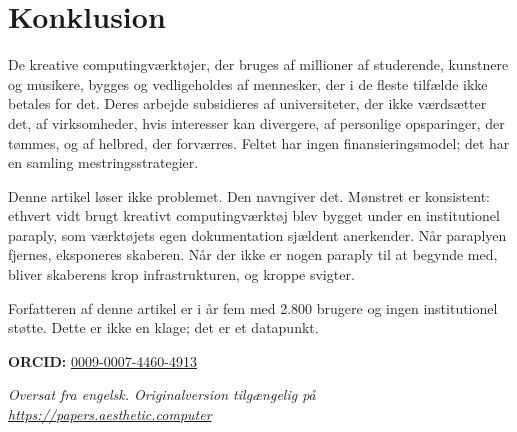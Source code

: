 \documentclass[10pt,letterpaper,twocolumn]{article}
\begin{document}
\section{Konklusion}

De kreative computingværktøjer, der bruges af millioner af studerende, kunstnere og musikere, bygges og vedligeholdes af mennesker, der i de fleste tilfælde ikke betales for det. Deres arbejde subsidieres af universiteter, der ikke værdsætter det, af virksomheder, hvis interesser kan divergere, af personlige opsparinger, der tømmes, og af helbred, der forværres. Feltet har ingen finansieringsmodel; det har en samling mestringsstrategier.

Denne artikel løser ikke problemet. Den navngiver det. Mønstret er konsistent: ethvert vidt brugt kreativt computingværktøj blev bygget under en institutionel paraply, som værktøjets egen dokumentation sjældent anerkender. Når paraplyen fjernes, eksponeres skaberen. Når der ikke er nogen paraply til at begynde med, bliver skaberens krop infrastrukturen, og kroppe svigter.

Forfatteren af denne artikel er i år fem med 2.800 brugere og ingen institutionel støtte. Dette er ikke en klage; det er et datapunkt.

\vspace{0.5em}
\noindent\textbf{ORCID:} \href{https://orcid.org/0009-0007-4460-4913}{0009-0007-4460-4913}

\vspace{0.5em}\noindent\textit{Oversat fra engelsk. Originalversion tilgængelig på \url{https://papers.aesthetic.computer}}



\end{document}
